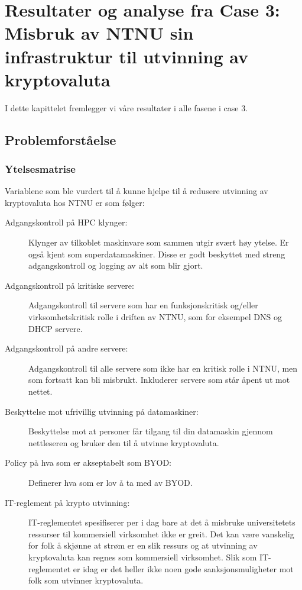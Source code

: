 \chapter{Resultater og analyse fra Case 3: Misbruk av NTNU sin infrastruktur til utvinning av kryptovaluta}
I dette kapittelet fremlegger vi våre resultater i alle fasene i case 3.
\section{Problemforståelse}
\subsection{Ytelsesmatrise}
Variablene som ble vurdert til å kunne hjelpe til å redusere utvinning av kryptovaluta hos NTNU er som følger:
\begin{description}
    \item[Adgangskontroll på HPC klynger:] Klynger av tilkoblet maskinvare som sammen utgir svært høy ytelse. Er også kjent som superdatamaskiner. Disse er godt beskyttet med streng adgangskontroll og logging av alt som blir gjort.
    \item[Adgangskontroll på kritiske servere:] Adgangskontroll til servere som har en funksjonskritisk og/eller virksomhetskritisk rolle i driften av NTNU, som for eksempel DNS og DHCP servere. 
    \item[Adgangskontroll på andre servere:] Adgangskontroll til alle servere som ikke har en kritisk rolle i NTNU, men som fortsatt kan bli misbrukt. Inkluderer servere som står åpent ut mot nettet. 
    \item[Beskyttelse mot ufrivillig utvinning på datamaskiner:] Beskyttelse mot at personer får tilgang til din datamaskin gjennom nettleseren og bruker den til å utvinne kryptovaluta. 
    \item[Policy på hva som er akseptabelt som BYOD:] Definerer hva som er lov å ta med av BYOD.
    \item[IT-reglement på krypto utvinning:] IT-reglementet spesifiserer per i dag bare at det å misbruke universitetets ressurser til kommersiell virksomhet ikke er greit. Det kan være vanskelig for folk å skjønne at strøm er en slik ressurs og at utvinning av kryptovaluta kan regnes som kommersiell virksomhet. Slik som IT-reglementet er idag er det heller ikke noen gode sanksjonsmuligheter mot folk som utvinner kryptovaluta.
\end{description}

